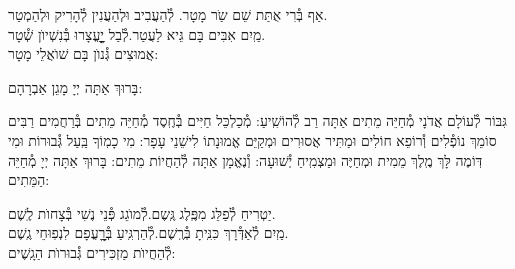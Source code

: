 \documentclass[twoside, openany, parskip=half, 11pt]{book}
\begin{document}


אַף בְּ֯רִי אֻתַּת שֵׁם שַֹר מָטָר. \hfill לְ֯הַעֲבִיב וּלְהַעֲנִין לְ֯הָרִיק וּלְהַמְטַר.\\
מַֽיִם אִבִּים בָּם גֵּיא לַעֲטַר.\hfill לְ֯בַל יׇׇׇׇׇׇעֳצָרוּ בְּ֯נִשְׁיוׂן שְׁ֯טָר.\\
אֲמוּצִים גְּ֯נוׂן בָּם שׁוׂאֲלֵי מָטָר:



בָּרוּךְ אַתָּה יְיָ מָגֵן אַבְרָהָם:

גִּבּוֹר לְ֯עוֹלָם אֲדֹנָי מְ֯חַיֵּה מֵתִים אַתָּה רַב לְ֯הוֹשִֽׁיעַ: מְ֯כַלְכֵּל חַיִּים בְּ֯חֶֽסֶד מְ֯חַיֵּה מֵתִים בְּ֯רַחֲמִים רַבִּים סוֹמֵךְ נוֹפְ֯לִים וְ֯רוֹפֵא חוֹלִים וּמַתִּיר אֲסוּרִים וּמְקַיֵּם אֱמוּנָתוֹ לִישֵׁנֵי עָפָר: מִי כָמֽוֹךָ בַּֽעַל גְּ֯בוּרוֹת וּמִי דּֽוֹמֶה לָּךְ מֶֽלֶךְ מֵמִית וּמְחַיֶּה וּמַצְמִֽיחַ יְ֯שׁוּעָה: וְ֯נֶאֱמָן אַתָּה לְ֯הַחֲיוֹת מֵתִים: בָּרוּךְ אַתָּה יְיָ מְ֯חַיֵּה הַמֵּתִים:





יַטְרִיחַ לְ֯פַלֵּג מִפֶּֽלֶג גֶּֽשֶם.\hfill לְ֯מוׂגֵג פְּ֯נֵי נֶשִׁי בְּ֯צָחוׂת לֶֽשֶׁם.\\
מַֽיִם לְ֯אַדְּ֯רָךְ כִּנִּֽיתָ בְּ֯רֶֽשֶׁם.\hfill לְ֯הַרְגִּֽיעַ בְּ֯רׇׇׇׇעֳפָם לִנְפֽוּחֵי גֶֽשֶׁם.\\
לְ֯הַחֲיוׂת מַזְכִּירִים גְּ֯בוּרוׂת הַגָֽשֶׁים:
\end{document}
